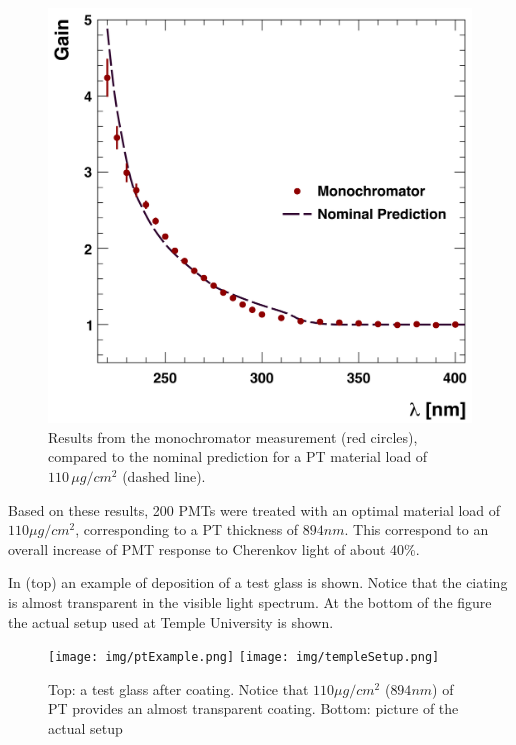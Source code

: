 \begin{figure}
	\centering
	\includegraphics[width=0.95\columnwidth,keepaspectratio]{img/ptQEResults.png}
	\caption{Results from the monochromator measurement (red circles), compared to the
				nominal prediction for a PT material load of
            $110\,\mu g/cm^2$ (dashed line).}
	\label{fig:ptQEResults}
\end{figure}

Based on these results, 200 PMTs were treated \cite{Joosten:2016lcl} with an optimal material load of $110 \mu g/ cm^2$,
corresponding to a PT thickness of $894 nm$. This correspond to an overall
increase of PMT response to Cherenkov light of about 40\%.

In  (top) an example of deposition of a test glass is shown. Notice that the ciating is almost
transparent in the visible light spectrum. At the bottom of the figure the actual setup used at Temple
University is shown.

\begin{figure}
	\centering
	\texttt{[image: img/ptExample.png]}
	\texttt{[image: img/templeSetup.png]}
\caption{Top: a test glass after coating. Notice that  $110 \mu g/ cm^2$ ($894 nm$) of PT provides an
almost transparent coating. Bottom: picture of the actual setup}
	\label{fig:ptExample}
\end{figure}




